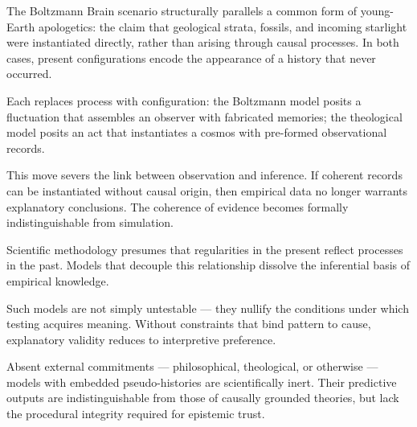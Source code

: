 \begin{commentary}
The Boltzmann Brain scenario structurally parallels a common form of young-Earth apologetics: the claim that geological strata, fossils, and incoming starlight were instantiated directly, rather than arising through causal processes. In both cases, present configurations encode the appearance of a history that never occurred.

Each replaces process with configuration: the Boltzmann model posits a fluctuation that assembles an observer with fabricated memories; the theological model posits an act that instantiates a cosmos with pre-formed observational records.

This move severs the link between observation and inference. If coherent records can be instantiated without causal origin, then empirical data no longer warrants explanatory conclusions. The coherence of evidence becomes formally indistinguishable from simulation.

Scientific methodology presumes that regularities in the present reflect processes in the past. Models that decouple this relationship dissolve the inferential basis of empirical knowledge.

Such models are not simply untestable — they nullify the conditions under which testing acquires meaning. Without constraints that bind pattern to cause, explanatory validity reduces to interpretive preference.

Absent external commitments — philosophical, theological, or otherwise — models with embedded pseudo-histories are scientifically inert. Their predictive outputs are indistinguishable from those of causally grounded theories, but lack the procedural integrity required for epistemic trust.
\end{commentary}

